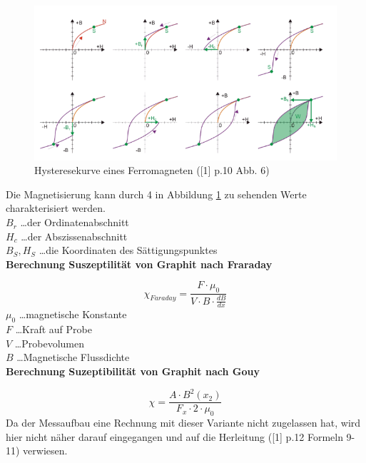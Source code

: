 \documentclass[12pt,a4paper]{article}
\begin{document}
\begin{multicols}{2}
\begin{figure}[H]
	\centering
	\includegraphics[scale=0.3]{./figures/hysterese.png}
	\caption{Hysteresekurve eines Ferromagneten ([1] p.10 Abb. 6)}
	\label{fig:hysterese}
\end{figure}

\noindent
Die Magnetisierung kann durch 4 in Abbildung \ref{fig:hysterese} zu sehenden Werte charakterisiert werden.\\
$B_r$ \ldots der Ordinatenabschnitt\\
$H_c$ \ldots der Abszissenabschnitt\\
$B_S, H_S$ \ldots die Koordinaten des Sättigungspunktes\\


\textbf{Berechnung Suszeptilität von Graphit nach Fraraday}

$$\chi_{Faraday} = \frac{F \cdot \mu_0}{V \cdot B \cdot \frac{dB}{dx}}$$
$\mu_0$ \ldots magnetische Konstante\\
$F$ \ldots Kraft auf Probe\\
$V$ \ldots Probevolumen\\
$B$ \ldots Magnetische Flussdichte\\

\noindent \textbf{Berechnung Suzeptibilität von Graphit nach Gouy}

$$\chi = \frac{A \cdot B^2(x_2)}{F_x \cdot 2 \cdot \mu_{0}} $$
Da der Messaufbau eine Rechnung mit dieser Variante nicht zugelassen hat, wird hier nicht näher darauf eingegangen und auf die Herleitung ([1] p.12 Formeln 9-11) verwiesen.\\


\end{multicols}
\end{document}
